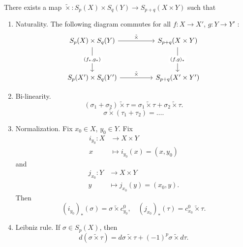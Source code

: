
\begin{theorem}
	\label{thm:ChainLevelCrossProduct}
	
	There exists a map $\tilde \times : S_p(X) \times S_q(Y) \to S_{p + q}(X \times Y)$ such that
	\begin{enumerate}
		\item Naturality. The following diagram commutes for all $f: X \to X'$, $g: Y \to  Y'$ :
\[\begin{tikzcd}
	{S_p(X) \times S_q(Y)} && {S_{p + q}(X \times Y)} \\
	\\
	{S_p(X') \times S_q(Y')} && {S_{p + q}(X' \times Y')}
	\arrow["\tilde\times", from=1-1, to=1-3]
	\arrow["{\tilde \times}", from=3-1, to=3-3]
	\arrow["{(f_*, g_*)}"{description}, from=1-1, to=3-1]
	\arrow["{(f, g)_*}"{description}, from=1-3, to=3-3]
\end{tikzcd}\]
\item Bi-linearity.
	\[
		(\sigma_1 + \sigma_2) \tilde \times \tau = \sigma_1 \tilde \times \tau + \sigma_2 \tilde \times  \tau
	.\] 
	\[
		\sigma \tilde \times (\tau_1 + \tau_2) = \ldots
	.\] 
\item Normalization.
	Fix $x_0 \in X$, $y_0 \in Y$. Fix
	\begin{align*}
		i_{y_0}: X &\longrightarrow X \times Y \\
		x &\longmapsto i_{y_0}(x) = (x, y_0)
	\end{align*}
	and
	\begin{align*}
		j_{x_0}: Y &\longrightarrow X \times Y \\
		y &\longmapsto j_{x_0}(y) = (x_0, y)
	.\end{align*}
	Then 
	\[
		\left( i_{y_0} \right) _* (\sigma) = \sigma \tilde \times  c_{y_0}^0, \quad
		\left( j_{x_0} \right) _*(\tau) = c_{x_0}^0 \tilde \times \tau
	.\] 
\item Leibniz rule. If $\sigma \in S_p(X)$, then
	\[
		d\left( \sigma \tilde \times  \tau \right)  = 
		d \sigma \tilde \times  \tau + (-1)^p \sigma \tilde \times d \tau
	.\] 
	\end{enumerate}
\end{theorem}

